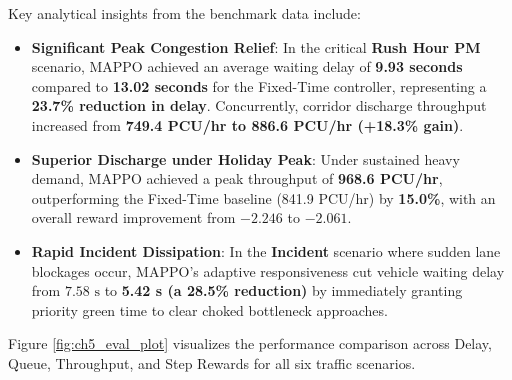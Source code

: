 Key analytical insights from the benchmark data include:
\begin{itemize}
    \item \textbf{Significant Peak Congestion Relief}: In the critical \textbf{Rush Hour PM} scenario, MAPPO achieved an average waiting delay of \textbf{9.93 seconds} compared to \textbf{13.02 seconds} for the Fixed-Time controller, representing a \textbf{23.7\% reduction in delay}. Concurrently, corridor discharge throughput increased from \textbf{749.4 PCU/hr to 886.6 PCU/hr (+18.3\% gain)}.
    \item \textbf{Superior Discharge under Holiday Peak}: Under sustained heavy demand, MAPPO achieved a peak throughput of \textbf{968.6 PCU/hr}, outperforming the Fixed-Time baseline (841.9 PCU/hr) by \textbf{15.0\%}, with an overall reward improvement from $-2.246$ to $-2.061$.
    \item \textbf{Rapid Incident Dissipation}: In the \textbf{Incident} scenario where sudden lane blockages occur, MAPPO's adaptive responsiveness cut vehicle waiting delay from $7.58\text{ s}$ to \textbf{5.42 s (a 28.5\% reduction)} by immediately granting priority green time to clear choked bottleneck approaches.
\end{itemize}

Figure \ref{fig:ch5_eval_plot} visualizes the performance comparison across Delay, Queue, Throughput, and Step Rewards for all six traffic scenarios.


